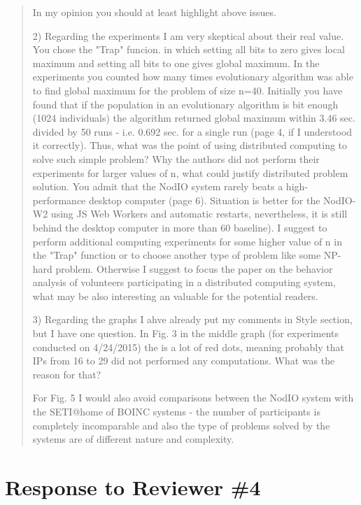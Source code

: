 \documentclass[preprint]{elsarticle}
\begin{document}
\begin{quote}
 In my opinion you should at least highlight above issues.

2) Regarding the experiments I am very skeptical about their real value. You chose the "Trap"
funcion. in which setting all bits to zero gives local maximum and setting all bits to one gives global
maximum. In the experiments you counted how many times evolutionary algorithm was able to find
global maximum for the problem of size n=40. Initially you have found that if the population in an
evolutionary algorithm is bit enough (1024 individuals) the algorithm returned global maximum
within 3.46 sec. divided by 50 runs - i.e. 0.692 sec. for a single run (page 4, if I understood it correctly).
Thus, what was the point of using distributed computing to solve such simple problem? Why the
authors did not perform their experiments for larger values of n, what could justify distributed problem
solution. You admit that the NodIO system rarely beats a high-performance desktop computer (page
6). Situation is better for the NodIO-W2 using JS Web Workers and automatic restarts, nevertheless,
it is still behind the desktop computer in more than 60%
baseline). I suggest to perform additional computing experiments for some higher value of n in the
"Trap" function or to choose another type of problem like some NP-hard problem. Otherwise I suggest
to focus the paper on the behavior analysis of volunteers participating in a distributed computing
system, what may be also interesting an valuable for the potential readers.

3) Regarding the graphs I ahve already put my comments in Style section, but I have one question. In
Fig. 3 in the middle graph (for experiments conducted on 4/24/2015) the is a lot of red dots,
meaning probably that IPs from 16 to 29 did not performed any computations. What was the reason
for that?

For Fig. 5 I would also avoid comparisons between the NodIO system with the SETI@home of BOINC
systems - the number of participants is completely incomparable and also the type of problems
solved by the systems are of different nature and complexity.
\end{quote}

\section{Response to Reviewer \#4}
\end{document}
